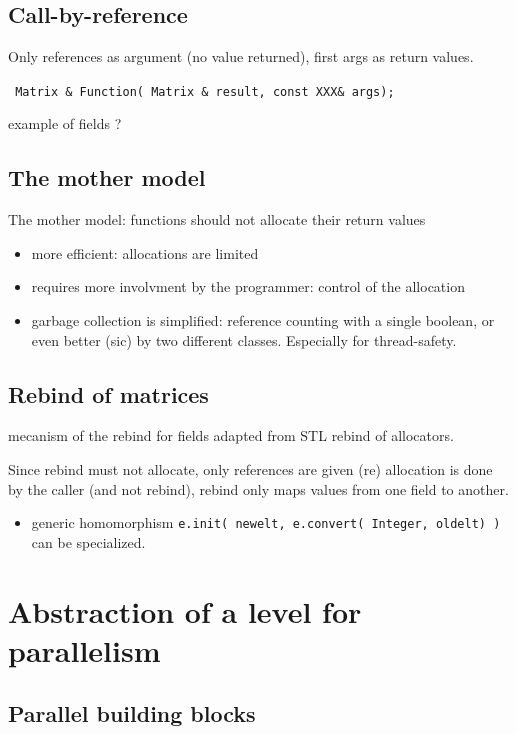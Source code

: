 \documentclass[runningheads,a4paper]{llncs}
\begin{document}
\subsection{Call-by-reference}

Only references as argument (no value returned), first args as return
values.

\verb! Matrix & Function( Matrix & result, const XXX& args); !

example of fields \cite[\S 2.1]{jgd:2002:icms} ?

\subsection{The mother model}


The mother model: functions should not allocate their return values

\begin{itemize}
\item more efficient: allocations are limited

\item requires more involvment by the programmer: control of the allocation

\item garbage collection is simplified: reference counting with a single
boolean, or even better (sic) by two different classes.
Especially for thread-safety.
\end{itemize}


\subsection{Rebind of matrices}

mecanism of the rebind for fields adapted from STL rebind of
allocators.

Since rebind must not allocate, only references are given (re)
allocation is done by the caller (and not rebind), rebind only maps
values from one field to another.

\begin{itemize}
\item generic homomorphism 
\verb!e.init( newelt, e.convert( Integer, oldelt) )!
can be specialized.
\end{itemize}

\section{Abstraction of a level for parallelism}
\subsection{Parallel building blocks}
\end{document}
